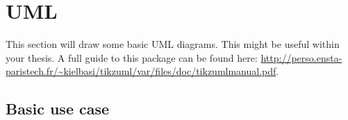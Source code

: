 
\chapter{UML}
\label{chap:UML}



This section will draw some basic UML diagrams. This might be useful within your thesis. A full guide to this package can be found here: \url{http://perso.ensta-paristech.fr/~kielbasi/tikzuml/var/files/doc/tikzumlmanual.pdf}.

\section{Basic use case}


